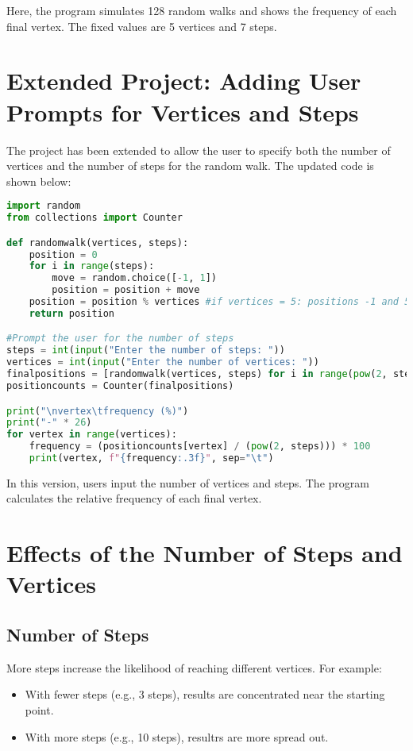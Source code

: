 \documentclass[11pt, a4paper]{amsart}
\begin{document}
Here, the program simulates 128 random walks and shows the frequency of each final vertex. The fixed values are 5 vertices and 7 steps.

\section{Extended Project: Adding User Prompts for Vertices and Steps}
The project has been extended to allow the user to specify both the number of vertices and the number of steps for the random walk. The updated code is shown below:

\begin{lstlisting}[language=Python]
import random
from collections import Counter

def randomwalk(vertices, steps):
    position = 0
    for i in range(steps):
        move = random.choice([-1, 1])
        position = position + move
    position = position % vertices #if vertices = 5: positions -1 and 5 both map to vertex 4. Always Positive
    return position

#Prompt the user for the number of steps
steps = int(input("Enter the number of steps: "))
vertices = int(input("Enter the number of vertices: "))
finalpositions = [randomwalk(vertices, steps) for i in range(pow(2, steps))]
positioncounts = Counter(finalpositions)

print("\nvertex\tfrequency (%)")
print("-" * 26)
for vertex in range(vertices):
    frequency = (positioncounts[vertex] / (pow(2, steps))) * 100
    print(vertex, f"{frequency:.3f}", sep="\t")
\end{lstlisting}

In this version, users input the number of vertices and steps. The program calculates the relative frequency of each final vertex.

\section{Effects of the Number of Steps and Vertices}
\subsection{Number of Steps}
More steps increase the likelihood of reaching different vertices.
For example:
\begin{itemize}
    \item With fewer steps (e.g., 3 steps), results are concentrated near the starting point.
    \item With more steps (e.g., 10 steps), resultrs are more spread out.
\end{itemize}
\end{document}
